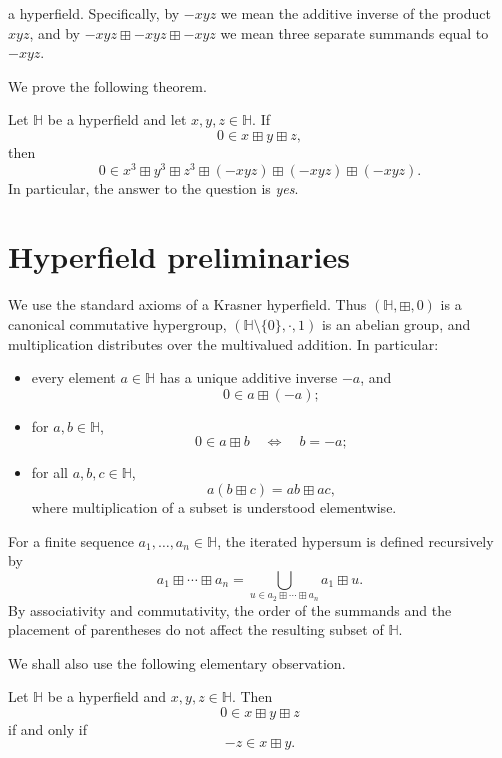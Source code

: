 a hyperfield. Specifically, by \(-xyz\) we mean the additive inverse of the product \(xyz\), and by \(-xyz\boxplus -xyz\boxplus -xyz\) we mean three separate summands equal to \(-xyz\).

We prove the following theorem.

\begin{theorem}\label{thm:main}
Let \(\mathbb H\) be a hyperfield and let \(x,y,z\in\mathbb H\). If
\[
0\in x\boxplus y\boxplus z,
\]
then
\[
0\in x^{3}\boxplus y^{3}\boxplus z^{3}\boxplus (-xyz)\boxplus(-xyz)\boxplus(-xyz).
\]
In particular, the answer to the question is \emph{yes}.
\end{theorem}

\section{Hyperfield preliminaries}

We use the standard axioms of a Krasner hyperfield. Thus \((\mathbb H,\boxplus,0)\) is a canonical commutative hypergroup, \((\mathbb H\setminus\{0\},\cdot,1)\) is an abelian group, and multiplication distributes over the multivalued addition. In particular:

\begin{itemize}
\item every element \(a\in\mathbb H\) has a unique additive inverse \(-a\), and
\[
0\in a\boxplus(-a);
\]
\item for \(a,b\in\mathbb H\),
\[
0\in a\boxplus b \quad\Longleftrightarrow\quad b=-a;
\]
\item for all \(a,b,c\in\mathbb H\),
\[
a(b\boxplus c)=ab\boxplus ac,
\]
where multiplication of a subset is understood elementwise.
\end{itemize}

For a finite sequence \(a_1,\dots,a_n\in\mathbb H\), the iterated hypersum is defined recursively by
\[
a_1\boxplus\cdots\boxplus a_n
=
\bigcup_{u\in a_2\boxplus\cdots\boxplus a_n} a_1\boxplus u.
\]
By associativity and commutativity, the order of the summands and the placement of parentheses do not affect the resulting subset of \(\mathbb H\).

We shall also use the following elementary observation.

\begin{lemma}\label{lem:witness}
Let \(\mathbb H\) be a hyperfield and \(x,y,z\in\mathbb H\). Then
\[
0\in x\boxplus y\boxplus z
\]
if and only if
\[
-z\in x\boxplus y.
\]
\end{lemma}

